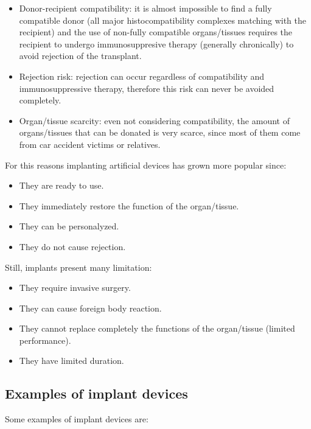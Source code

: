 \begin{multicols}{2}
  \begin{itemize}
    \item Donor-recipient compatibility: it is almost impossible to find a fully compatible donor (all major histocompatibility complexes matching with the recipient) and the use of non-fully compatible organs/tissues requires the recipient to undergo immunosuppresive therapy (generally chronically) to avoid rejection of the transplant.
    \item Rejection risk: rejection can occur regardless of compatibility and immunosuppressive therapy, therefore this risk can never be avoided completely.
    \item Organ/tissue scarcity: even not considering compatibility, the amount of organs/tissues that can be donated is very scarce, since most of them come from car accident victims or relatives.
  \end{itemize}
\end{multicols}

For this reasons implanting artificial devices has grown more popular since:

\begin{multicols}{2}
  \begin{itemize}
    \item They are ready to use.
    \item They immediately restore the function of the organ/tissue.
    \item They can be personalyzed.
    \item They do not cause rejection.
  \end{itemize}
\end{multicols}

Still, implants present many limitation:

\begin{multicols}{2}
  \begin{itemize}
    \item They require invasive surgery.
    \item They can cause foreign body reaction.
    \item They cannot replace completely the functions of the organ/tissue (limited performance).
    \item They have limited duration.
  \end{itemize}
\end{multicols}

  \subsection{Examples of implant devices}
  Some examples of implant devices are:

